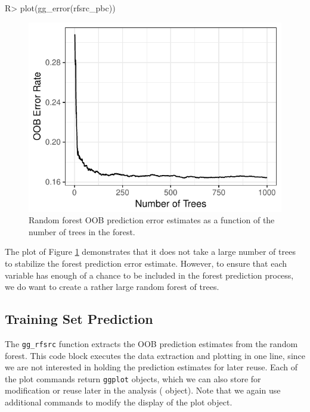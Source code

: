 \documentclass[article]{jss}
\begin{document}
\begin{Schunk}
\begin{Sinput}
R> plot(gg_error(rfsrc_pbc))
\end{Sinput}
\begin{figure}[!htb]

{\centering \includegraphics{fig-rfs/rfs-errorPlot-1} 

}

\caption[Random forest OOB prediction error estimates as a function of the number of trees in the forest]{Random forest OOB prediction error estimates as a function of the number of trees in the forest.}\label{fig:errorPlot}
\end{figure}
\end{Schunk}

The  plot of Figure \ref{fig:errorPlot} demonstrates that
it does not take a large number of trees to stabilize the forest
prediction error estimate. However, to ensure that each variable has
enough of a chance to be included in the forest prediction process, we
do want to create a rather large random forest of trees.

\subsection{Training Set Prediction}\label{training-set-prediction}

The \texttt{gg\_rfsrc} function extracts the OOB prediction estimates
from the random forest. This code block executes the data extraction and
plotting in one line, since we are not interested in holding the
prediction estimates for later reuse. Each of the 
plot commands return \texttt{ggplot} objects, which we can also store
for modification or reuse later in the analysis ( object).
Note that we again use additional  commands to modify the
display of the plot object.
\end{document}
